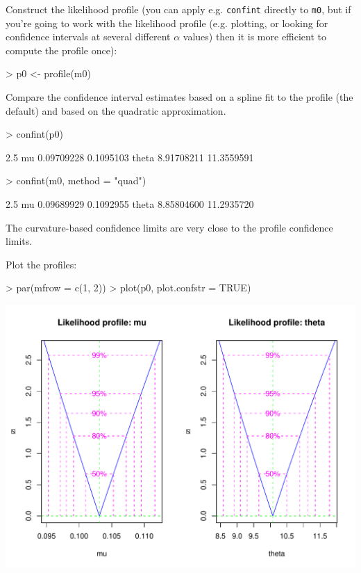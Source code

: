 \documentclass{article}
\newcommand{\code}[1]{{\tt #1}}
\begin{document}
Construct the likelihood profile (you can
apply e.g. \code{confint} directly to \code{m0},
but if you're going to work with the likelihood
profile (e.g. plotting, or looking for confidence
intervals at several different $\alpha$ values)
then it is more efficient to compute the profile
once):

\begin{Schunk}
\begin{Sinput}
> p0 <- profile(m0)
\end{Sinput}
\end{Schunk}

Compare the confidence interval estimates based on
a spline fit to the profile (the default)
and based on the quadratic approximation.
\begin{Schunk}
\begin{Sinput}
> confint(p0)
\end{Sinput}
\begin{Soutput}
           2.5 %
mu    0.09709228  0.1095103
theta 8.91708211 11.3559591
\end{Soutput}
\begin{Sinput}
> confint(m0, method = "quad")
\end{Sinput}
\begin{Soutput}
           2.5 %
mu    0.09689929  0.1092955
theta 8.85804600 11.2935720
\end{Soutput}
\end{Schunk}

The curvature-based confidence
limits are very close to the profile confidence
limits.

Plot the profiles:
\begin{Schunk}
\begin{Sinput}
> par(mfrow = c(1, 2))
> plot(p0, plot.confstr = TRUE)
\end{Sinput}
\end{Schunk}
\includegraphics{mle2-010}
\end{document}
